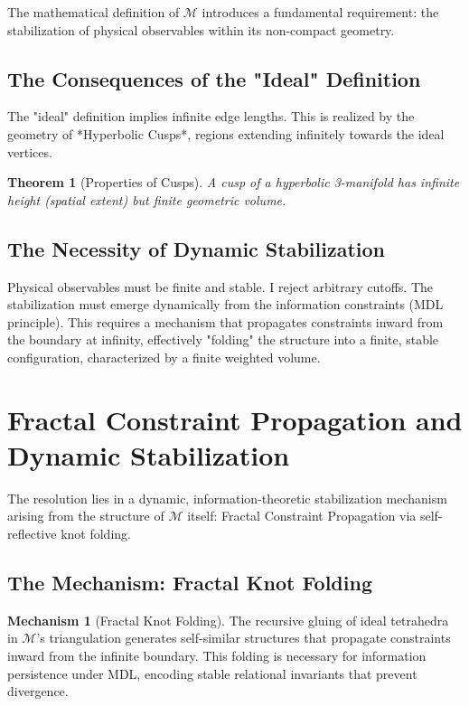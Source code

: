 \documentclass[11pt, a4paper]{article}
\newtheorem{theorem}{Theorem}[section]
\theoremstyle{definition}
\newtheorem{mechanism}{Mechanism}
\theoremstyle{definition}
\newcommand{\M}{\mathcal{M}}
\begin{document}
The mathematical definition of $\M$ introduces a fundamental requirement: the stabilization of physical observables within its non-compact geometry.

\subsection{The Consequences of the "Ideal" Definition}

The "ideal" definition implies infinite edge lengths. This is realized by the geometry of *Hyperbolic Cusps*, regions extending infinitely towards the ideal vertices.

\begin{theorem}[Properties of Cusps]\label{thm:cusps}
A cusp of a hyperbolic 3-manifold has infinite height (spatial extent) but finite geometric volume.
\end{theorem}

\subsection{The Necessity of Dynamic Stabilization}

Physical observables must be finite and stable. I reject arbitrary cutoffs. The stabilization must emerge dynamically from the information constraints (MDL principle). This requires a mechanism that propagates constraints inward from the boundary at infinity, effectively "folding" the structure into a finite, stable configuration, characterized by a finite weighted volume.

\section{Fractal Constraint Propagation and Dynamic Stabilization}

The resolution lies in a dynamic, information-theoretic stabilization mechanism arising from the structure of $\M$ itself: Fractal Constraint Propagation via self-reflective knot folding.

\subsection{The Mechanism: Fractal Knot Folding}

\begin{mechanism}[Fractal Knot Folding]
The recursive gluing of ideal tetrahedra in $\M$'s triangulation generates self-similar structures that propagate constraints inward from the infinite boundary. This folding is necessary for information persistence under MDL, encoding stable relational invariants that prevent divergence.
\end{mechanism}
\end{document}
